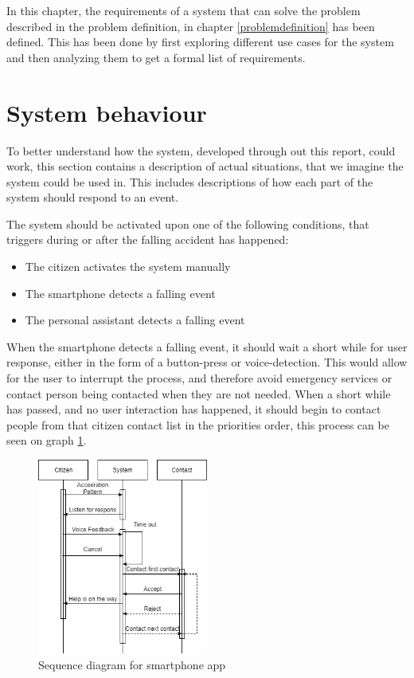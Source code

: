 In this chapter, the requirements of a system that can solve the problem described in the problem definition, in chapter \ref{problemdefinition} has been defined. This has been done by first exploring different use cases for the system and then analyzing them to get a formal list of requirements.

\section{System behaviour}
\label{sec:system-behaviour}
To better understand how the system, developed through out this report, could work, this section contains a description of actual situations, that we imagine the system could be used in. This includes descriptions of how each part of the system should respond to an event.

The system should be activated upon one of the following conditions, that triggers during or after the falling accident has happened:

\begin{itemize}
    \item The citizen activates the system manually
    \item The smartphone detects a falling event
    \item The personal assistant detects a falling event
\end{itemize}

When the smartphone detects a falling event, it should wait a short while for user response, either in the form of a button-press or voice-detection. This would allow for the user to interrupt the process, and therefore avoid emergency services or contact person being contacted when they are not needed. When a short while has passed, and no user interaction has happened, it should begin to contact people from that citizen contact list in the priorities order, this process can be seen on graph \ref{fig:SmartPhoneApp}.

\begin{figure}[H]
    \centering
    \includegraphics[width=0.5\textwidth]{Figures/Phone.png}
    \caption{Sequence diagram for smartphone app}
    \label{fig:SmartPhoneApp}
\end{figure}

